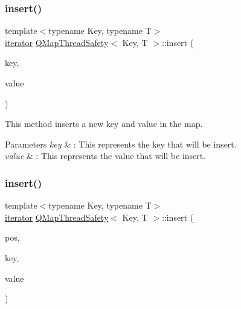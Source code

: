 \mbox{\label{class_q_map_thread_safety_a156afe871591b26ce155da6ce6409ad6}} 
\subsubsection{\texorpdfstring{insert()}{insert()}\hspace{0.1cm}{\footnotesize\ttfamily [1/2]}}
{\footnotesize\ttfamily template$<$typename Key, typename T$>$ \\
\hyperlink{class_q_map_thread_safety_a454c8af3f68e6d61aecaf1b918aa525b}{iterator} \hyperlink{class_q_map_thread_safety}{Q\+Map\+Thread\+Safety}$<$ Key, T $>$\+::insert (\begin{DoxyParamCaption}\item[{const Key \&}]{key,  }\item[{const T \&}]{value }\end{DoxyParamCaption})\hspace{0.3cm}{\ttfamily [inline]}}



This method inserts a new key and value in the map. 


\begin{DoxyParams}{Parameters}
{\em key} & \+: This represents the key that will be insert. \\
\hline
{\em value} & \+: This represents the value that will be insert. \\
\hline
\end{DoxyParams}
\mbox{\label{class_q_map_thread_safety_a479e559360d2ba5471304b3dc9deb9dd}} 
\subsubsection{\texorpdfstring{insert()}{insert()}\hspace{0.1cm}{\footnotesize\ttfamily [2/2]}}
{\footnotesize\ttfamily template$<$typename Key, typename T$>$ \\
\hyperlink{class_q_map_thread_safety_a454c8af3f68e6d61aecaf1b918aa525b}{iterator} \hyperlink{class_q_map_thread_safety}{Q\+Map\+Thread\+Safety}$<$ Key, T $>$\+::insert (\begin{DoxyParamCaption}\item[{\hyperlink{class_q_map_thread_safety_aa58d8479729f72b33e305a4d0ca957bd}{const\+\_\+iterator}}]{pos,  }\item[{const Key \&}]{key,  }\item[{const T \&}]{value }\end{DoxyParamCaption})\hspace{0.3cm}{\ttfamily [inline]}}


